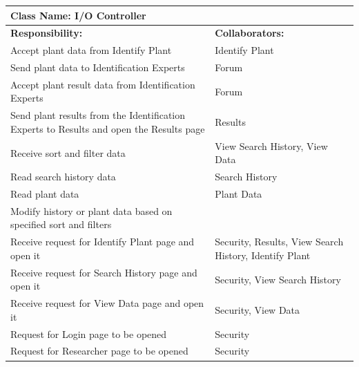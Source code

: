 \documentclass[]{article}
\begin{document}
		\centering
		\begin{tabular}{|p{7cm}|p{7cm}|}
		\hline 
		 \multicolumn{2}{|l|}{\textbf{Class Name: I/O Controller}} \\
		\hline
		\textbf{Responsibility:} & \textbf{Collaborators:} \\
		\hline
		Accept plant data from Identify Plant & Identify Plant \\
		\hline
		Send plant data to Identification Experts & Forum \\
		\hline
		Accept plant result data from Identification Experts & Forum \\
		\hline
		Send plant results from the Identification Experts to Results and open the Results page & Results \\
		\hline
		Receive sort and filter data & View Search History, View Data \\
		\hline
		Read search history data & Search History \\
		\hline
		Read plant data & Plant Data \\
		\hline
		Modify history or plant data based on specified sort and filters & \\
		\hline
		Receive request for Identify Plant page and open it & Security, Results, View Search History, Identify Plant \\
		\hline
		Receive request for Search History page and open it & Security, View Search History \\
		\hline
		Receive request for View Data page and open it & Security, View Data \\
		\hline
		Request for Login page to be opened & Security \\
		\hline
		Request for Researcher page to be opened & Security \\
		\hline
		\end{tabular}
	\newline
	\vspace*{0.5 cm}
	\newline
\end{document}
